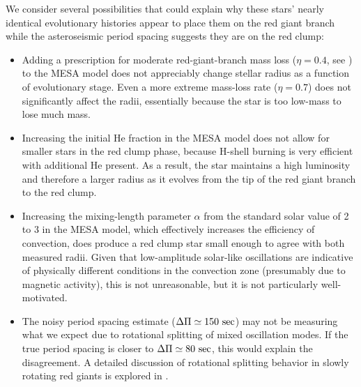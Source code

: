 We consider several possibilities that could explain why these stars' nearly identical evolutionary histories appear to place them on the red giant branch while the asteroseismic period spacing suggests they are on the red clump:
\begin{itemize}
\item Adding a prescription for moderate red-giant-branch mass loss ($\eta = 0.4$, see \citet{mig12}) to the MESA model does not appreciably change stellar radius as a function of evolutionary stage. Even a more extreme mass-loss rate ($\eta = 0.7$) does not significantly affect the radii, essentially because the star is too low-mass to lose much mass.
\item Increasing the initial He fraction in the MESA model does not allow for smaller stars in the red clump phase, because H-shell burning is very efficient with additional He present. As a result, the star maintains a high luminosity and therefore a larger radius as it evolves from the tip of the red giant branch to the red clump.
\item Increasing the mixing-length parameter $\alpha$ from the standard solar value of 2 to 3 in the MESA model, which effectively increases the efficiency of convection, does produce a red clump star small enough to agree with both measured radii. Given that low-amplitude solar-like oscillations are indicative of physically different conditions in the convection zone (presumably due to magnetic activity), this is not unreasonable, but it is not particularly well-motivated.
\item The noisy period spacing estimate ($\Delta \Pi \simeq 150 \ \rm{sec}$) may not be measuring what we expect due to rotational splitting of mixed oscillation modes. If the true period spacing is closer to $\Delta \Pi \simeq 80 \ \rm{sec}$, this would explain the disagreement. A detailed discussion of rotational splitting behavior in slowly rotating red giants is explored in \citet{gou13}.
\end{itemize}

  